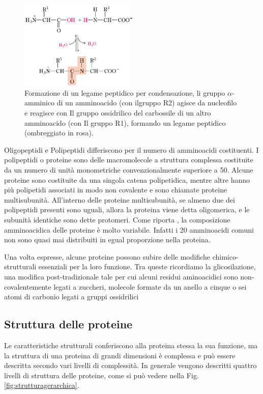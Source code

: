 \begin{figure}
	\centering
	\includegraphics[width=0.5\textwidth]{Immagini/LegamePeptidico.png}
	\caption{Formazione di un legame peptidico per condensazione, li gruppo $\alpha$-amminico di un amminoacido (con ilgruppo R2) agisce da nucleofilo e reagisce con Il gruppo ossidrilico del carbossile di un altro amminoacido (con Il gruppo R1), formando un legame peptidico (ombreggiato in rosa).}
	\label{fig:legamepeptidico}
\end{figure}

Oligopeptidi e Polipeptidi differiscono per il numero di amminoacidi costituenti. I polipeptidi o proteine sono delle macromolecole a struttura complessa costituite da un numero di unità monometriche convenzionalmente  superiore a 50. Alcune proteine sono costituite da una singola catena polipetidica, mentre altre hanno più polipetidi associati in modo non covalente e sono chiamate proteine multisubunità. All'interno delle proteine multisubunità, se almeno due dei polipeptidi presenti sono uguali, allora la proteina viene detta oligomerica, e le subunità identiche sono dette protomeri. Come riporta \cite{Principi}, la composizione amminoacidica delle proteine è molto variabile. Infatti i 20 amminoacidi comuni non sono quasi mai distribuiti in egual proporzione nella proteina.

Una volta espresse, alcune proteine possono subire delle modifiche chimico-strutturali essenziali per la loro funzione. Tra queste ricordiamo la glicosilazione, una modifica post-tradizionale tale per cui alcuni residui aminoacidici sono non-covalentemente legati a zuccheri, molecole formate da un anello a cinque o sei atomi di carbonio legati a gruppi ossidrilici
 
\subsection{Struttura delle proteine}\label{subsec:strutturaproteine}
Le caratteristiche strutturali conferiscono alla proteina stessa la sua funzione, ma la struttura di una proteina di grandi dimensioni è complessa e può essere descritta secondo vari livelli di complessità. In generale vengono descritti quattro livelli di struttura delle proteine, come si può vedere nella Fig. \ref{fig:strutturagerarchica}. 

